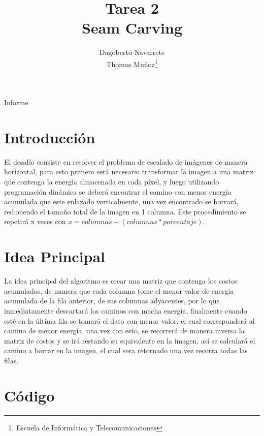 \documentclass[twocolumn,11pts]{IEEEtran}
\begin{document}
\title{Tarea 2\\ Seam Carving}


\author{Dagoberto Navarrete\\Thomas Muñoz\thanks{Escuela de Informática y Telecomunicaciones}%
}

{Informe}
\maketitle
\section{Introducción}
El desafío consiste en resolver el problema de escalado de imágenes de manera horizontal, para esto primero será necesario transformar la imagen a una matriz que contenga la energía almacenada en cada píxel, y luego utilizando programación dinámica se deberá encontrar el camino con menor energía acumulada que este enlazado verticalmente, una vez encontrado se borrará, reduciendo el tamaño total de la imagen en 1 columna. Este procedimiento se repetirá x veces con  $x = columnas - (columnas*porcentaje)$.

\section{Idea Principal}
La idea principal del algoritmo es crear una matriz que contenga los costos acumulados, de manera que cada columna tome el menor valor de energía acumulada de la fila anterior, de sus columnas adyacentes, por lo que inmediatamente descartará los caminos con mucha energía, finalmente cuando esté en la última fila se tomará el dato con menor valor, el cual corresponderá  al camino de menor energía, una vez con esto, se recorrerá de manera inversa la matriz de costos y se irá restando su equivalente en la imagen, así se calculará el camino a borrar en la imagen, el cual sera retornado una vez recorra todas las filas. %

\section{Código}


\end{document}
